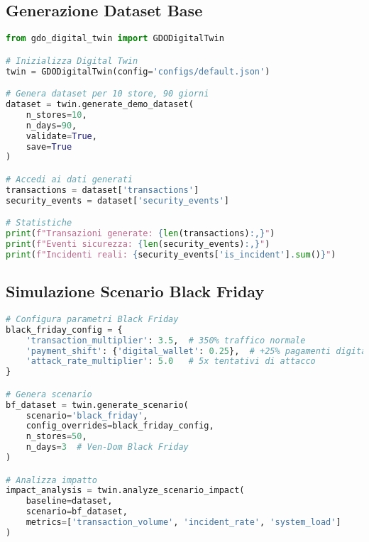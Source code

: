 \subsection{\texorpdfstring{Generazione Dataset Base}{B.2.1 - Generazione Dataset Base}}

\begin{lstlisting}[language=Python, caption={Esempio generazione dataset base}]
from gdo_digital_twin import GDODigitalTwin

# Inizializza Digital Twin
twin = GDODigitalTwin(config='configs/default.json')

# Genera dataset per 10 store, 90 giorni
dataset = twin.generate_demo_dataset(
    n_stores=10,
    n_days=90,
    validate=True,
    save=True
)

# Accedi ai dati generati
transactions = dataset['transactions']
security_events = dataset['security_events']

# Statistiche
print(f"Transazioni generate: {len(transactions):,}")
print(f"Eventi sicurezza: {len(security_events):,}")
print(f"Incidenti reali: {security_events['is_incident'].sum()}")
\end{lstlisting}

\subsection{\texorpdfstring{Simulazione Scenario Black Friday}{B.2.2 - Simulazione Scenario Black Friday}}

\begin{lstlisting}[language=Python, caption={Simulazione scenario Black Friday}]
# Configura parametri Black Friday
black_friday_config = {
    'transaction_multiplier': 3.5,  # 350% traffico normale
    'payment_shift': {'digital_wallet': 0.25},  # +25% pagamenti digitali
    'attack_rate_multiplier': 5.0   # 5x tentativi di attacco
}

# Genera scenario
bf_dataset = twin.generate_scenario(
    scenario='black_friday',
    config_overrides=black_friday_config,
    n_stores=50,
    n_days=3  # Ven-Dom Black Friday
)

# Analizza impatto
impact_analysis = twin.analyze_scenario_impact(
    baseline=dataset,
    scenario=bf_dataset,
    metrics=['transaction_volume', 'incident_rate', 'system_load']
)
\end{lstlisting}

